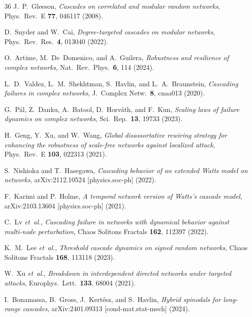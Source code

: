 \documentclass[aps,pre,twocolumn,superscriptaddress,showpacs]{revtex4-2}
\begin{document}
\begin{thebibliography}{36}
J.~P.~Gleeson,
\emph{Cascades on correlated and modular random networks},
Phys.\ Rev.\ E \textbf{77}, 046117 (2008).

D.~Snyder and W.~Cai,
\emph{Degree-targeted cascades on modular networks},
Phys.\ Rev.\ Res.\ \textbf{4}, 013040 (2022).

O.~Artime, M.~De~Domenico, and A.~Guilera,
\emph{Robustness and resilience of complex networks},
Nat.\ Rev.\ Phys.\ \textbf{6}, 114 (2024).

L.~D.~Valdez, L.~M.~Shekhtman, S.~Havlin, and L.~A.~Braunstein,
\emph{Cascading failures in complex networks},
J.\ Complex Netw.\ \textbf{8}, cnaa013 (2020).

G.~P\'al, Z.~Danku, A.~Batool, D.~Horv\'ath, and F.~Kun,
\emph{Scaling laws of failure dynamics on complex networks},
Sci.\ Rep.\ \textbf{13}, 19733 (2023).

H.~Geng, Y.~Xu, and W.~Wang,
\emph{Global disassortative rewiring strategy for enhancing the robustness of scale-free networks against localized attack},
Phys.\ Rev.\ E \textbf{103}, 022313 (2021).

S.~Nishioka and T.~Hasegawa,
\emph{Cascading behavior of an extended Watts model on networks},
arXiv:2112.10524 [physics.soc-ph] (2022).

F.~Karimi and P.~Holme,
\emph{A temporal network version of Watts's cascade model},
arXiv:2103.13604 [physics.soc-ph] (2021).

C.~Lv \emph{et~al.},
\emph{Cascading failure in networks with dynamical behavior against multi-node perturbation},
Chaos Solitons Fractals \textbf{162}, 112397 (2022).

K.~M.~Lee \emph{et~al.},
\emph{Threshold cascade dynamics on signed random networks},
Chaos Solitons Fractals \textbf{168}, 113118 (2023).

W.~Xu \emph{et~al.},
\emph{Breakdown in interdependent directed networks under targeted attacks},
Europhys.\ Lett.\ \textbf{133}, 68004 (2021).

I.~Bonamassa, B.~Gross, J.~Kert\'esz, and S.~Havlin,
\emph{Hybrid spinodals for long-range cascades},
arXiv:2401.09313 [cond-mat.stat-mech] (2024).

\end{thebibliography}

\appendix
\end{document}
